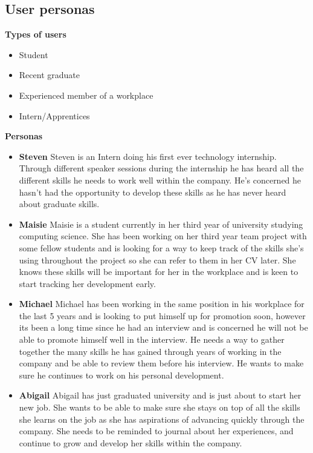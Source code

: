 \documentclass{l4proj}
\begin{document}
\begin{appendices}
%
\section{User personas} \label{Appendix-userPersonas}

\textbf{Types of users}
\begin{itemize}
    \item Student
    \item Recent graduate
    \item Experienced member of a workplace
    \item Intern/Apprentices
\end{itemize}

\textbf{Personas}
\begin{itemize}
    \item \textbf{Steven} Steven is an Intern doing his first ever technology internship. Through different speaker sessions during the internship he has heard all the different skills he needs to work well within the company. He's concerned he hasn't had the opportunity to develop these skills as he has never heard about graduate skills.
    \item \textbf{Maisie} Maisie is a student currently in her third year of university studying computing science. She has been working on her third year team project with some fellow students and is looking for a way to keep track of the skills she's using throughout the project so she can refer to them in her CV later. She knows these skills will be important for her in the workplace and is keen to start tracking her development early.
    \item \textbf{Michael} Michael has been working in the same position in his workplace for the last 5 years and is looking to put himself up for promotion soon, however its been a long time since he had an interview and is concerned he will not be able to promote himself well in the interview. He needs a way to gather together the many skills he has gained through years of working in the company and be able to review them before his interview. He wants to make sure he continues to work on his personal development.
    \item \textbf{Abigail} Abigail has just graduated university and is just about to start her new job. She wants to be able to make sure she stays on top of all the skills she learns on the job as she has aspirations of advancing quickly through the company. She needs to be reminded to journal about her experiences, and continue to grow and develop her skills within the company.
\end{itemize}


\end{appendices}
\end{document}
